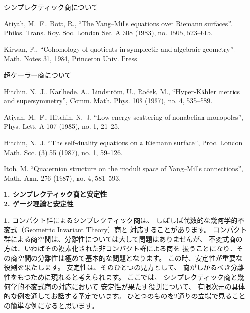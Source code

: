 \documentclass[uplatex,dvipdfmx]{jlreq}
\begin{document}
\noindent
シンプレクティック商について

\noindent
[AB]
Atiyah, M.~F., Bott, R.,
``The Yang--Mills equations over Riemann surfaces''.
Philos. Trans. Roy. Soc. London Ser. A 308 (1983),
no. 1505, 523--615.

\noindent
[K]
Kirwan, F.,
``Cohomology of quotients in symplectic and algebraic
geometry'', Math. Notes 31, 1984,
Princeton Univ. Press
\vspace{6pt}

\noindent
超ケーラー商について

\noindent
[HKLR]
Hitchin, N.~J., Karlhede, A.,
Lindström, U., Roček, M.,
``Hyper-Kähler metrics and supersymmetry'',
Comm. Math. Phys. 108 (1987), no. 4, 535--589.

\noindent
[AH]
Atiyah, M.~F., Hitchin, N.~J.
``Low energy scattering of nonabelian monopoles'',
Phys. Lett. A 107 (1985), no. 1, 21--25.

\noindent
[H]
Hitchin, N.~J.
``The self-duality equations on a Riemann surface'',
Proc. London Math. Soc. (3) 55 (1987), no. 1, 59--126.

\noindent
[I]
Itoh, M.
``Quaternion structure on the moduli space of
Yang--Mills connections'',
Math. Ann. 276 (1987), no. 4, 581--593.

\newpage

\begin{center}
{\large\bfseries 1. シンプレクティック商と安定性\\
2. ゲージ理論と安定性}\\[6pt]
\hspace*{\fill}{\large\bfseries 太田　啓史（名大・多元数理）}
\end{center}
\vspace{1pc}

\noindent
\textbf{1.} コンパクト群によるシンプレクティック商は、
しばしば代数的な幾何学的不変式（Geometric Invariant Theory）商と
対応することがあります。
コンパクト群による商空間は、分離性については大して問題はありませんが、
不変式商の方は、いわばその複素化された非コンパクト群による商を
扱うことになり、その商空間の分離性は極めて基本的な問題となります。
この時、安定性が重要な役割を果たします。
安定性は、そのひとつの見方として、
商がしかるべき分離性をもつために現れると考えられます。
ここでは、
シンプレクティック商と幾何学的不変式商の対応において
安定性が果たす役割について、
有限次元の具体的な例を通してお話する予定でいます。
ひとつのものを2通りの立場で見ることの簡単な例になると思います。
\vspace{1pc}
\end{document}
